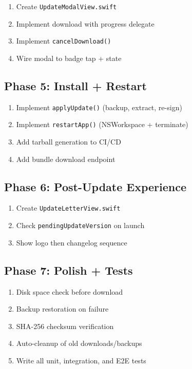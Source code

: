 \documentclass[11pt, a4paper]{article}
\begin{document}
\begin{enumerate}[nosep, leftmargin=*, start=13]
  \item Create \texttt{UpdateModalView.swift}
  \item Implement download with progress delegate
  \item Implement \texttt{cancelDownload()}
  \item Wire modal to badge tap + state
\end{enumerate}

\subsection{Phase 5: Install + Restart}

\begin{enumerate}[nosep, leftmargin=*, start=17]
  \item Implement \texttt{applyUpdate()} (backup, extract, re-sign)
  \item Implement \texttt{restartApp()} (NSWorkspace + terminate)
  \item Add tarball generation to CI/CD
  \item Add bundle download endpoint
\end{enumerate}

\subsection{Phase 6: Post-Update Experience}

\begin{enumerate}[nosep, leftmargin=*, start=21]
  \item Create \texttt{UpdateLetterView.swift}
  \item Check \texttt{pendingUpdateVersion} on launch
  \item Show logo then changelog sequence
\end{enumerate}

\subsection{Phase 7: Polish + Tests}

\begin{enumerate}[nosep, leftmargin=*, start=24]
  \item Disk space check before download
  \item Backup restoration on failure
  \item SHA-256 checksum verification
  \item Auto-cleanup of old downloads/backups
  \item Write all unit, integration, and E2E tests
\end{enumerate}
\end{document}
